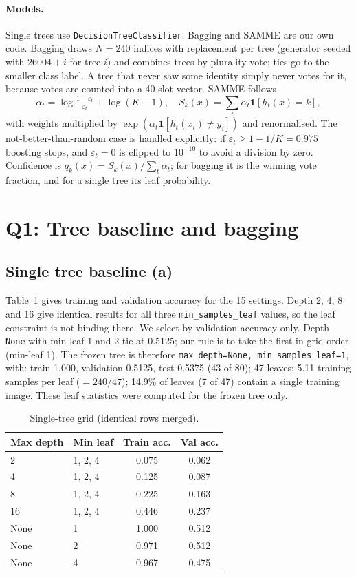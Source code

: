 \documentclass[10pt,twocolumn,letterpaper]{article}
\begin{document}
\paragraph{Models.}
Single trees use \texttt{DecisionTreeClassifier}. Bagging and SAMME are our own code. Bagging draws $N{=}240$ indices with replacement per tree (generator seeded with $26004{+}i$ for tree $i$) and combines trees by plurality vote; ties go to the smaller class label. A tree that never saw some identity simply never votes for it, because votes are counted into a 40-slot vector. SAMME follows
\begin{equation}
\alpha_t=\log\tfrac{1-\varepsilon_t}{\varepsilon_t}+\log(K-1),\quad S_k(x)=\sum_t\alpha_t\mathbf 1[h_t(x){=}k],
\end{equation}
with weights multiplied by $\exp(\alpha_t\mathbf 1[h_t(x_i)\ne y_i])$ and renormalised. The not-better-than-random case is handled explicitly: if $\varepsilon_t\ge 1-1/K=0.975$ boosting stops, and $\varepsilon_t=0$ is clipped to $10^{-10}$ to avoid a division by zero. Confidence is $q_k(x)=S_k(x)/\sum_t\alpha_t$; for bagging it is the winning vote fraction, and for a single tree its leaf probability.

\section{Q1: Tree baseline and bagging}

\subsection{Single tree baseline (a)}
Table~\ref{tab:grid} gives training and validation accuracy for the 15 settings. Depth 2, 4, 8 and 16 give identical results for all three \texttt{min\_samples\_leaf} values, so the leaf constraint is not binding there. We select by validation accuracy only. Depth \texttt{None} with min-leaf 1 and 2 tie at 0.5125; our rule is to take the first in grid order (min-leaf 1). The frozen tree is therefore \texttt{max\_depth=None, min\_samples\_leaf=1}, with:
train 1.000, validation 0.5125, test 0.5375 (43 of 80); 47 leaves; 5.11 training samples per leaf ($=240/47$); 14.9\% of leaves (7 of 47) contain a single training image. These leaf statistics were computed for the frozen tree only.

\begin{table}[t]
\centering\small
\begin{tabular}{@{}llcc@{}}
\toprule
Max depth & Min leaf & Train acc. & Val acc.\\
\midrule
2 & 1, 2, 4 & 0.075 & 0.062\\
4 & 1, 2, 4 & 0.125 & 0.087\\
8 & 1, 2, 4 & 0.225 & 0.163\\
16 & 1, 2, 4 & 0.446 & 0.237\\
None & 1 & 1.000 & 0.512\\
None & 2 & 0.971 & 0.512\\
None & 4 & 0.967 & 0.475\\
\bottomrule
\end{tabular}
\caption{Single-tree grid (identical rows merged).}
\label{tab:grid}
\end{table}
\end{document}

